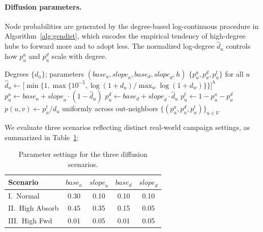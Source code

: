 \documentclass[sigconf]{acmart}
\begin{document}
\paragraph{Diffusion parameters.}
Node probabilities are generated by the degree-based log-continuous
procedure in Algorithm~\ref{alg:gendist}, which encodes the empirical
tendency of high-degree hubs to forward more and to adopt less.
The normalized log-degree $\hat{d}_u$ controls how $p_u^a$ and $p_u^d$
scale with degree.

\begin{algorithm}[t]
\caption{Degree-Based Node Probability Generation}
\label{alg:gendist}
\begin{algorithmic}[1]
\Require Degrees $\{d_u\}$; parameters
  $(\mathit{base}_a, \mathit{slope}_a, \mathit{base}_d,
    \mathit{slope}_d, h)$
\Ensure $\{p_u^a, p_u^d, p_u^t\}$ for all $u$
  \State $\hat{d}_u \gets
    \bigl[\min\{1,\max\{10^{-5},
    \log(1{+}d_u)/\max_w\log(1{+}d_w)\}\}\bigr]^h$
\EndFor
{}
  \State $p_u^a \gets \mathit{base}_a
    + \mathit{slope}_a \cdot (1-\hat{d}_u)$
  \State $p_u^d \gets \mathit{base}_d
    + \mathit{slope}_d \cdot \hat{d}_u$
  \State $p_u^t \gets 1 - p_u^a - p_u^d$
\EndFor
\State $p(u,v) \gets p_u^t / d_u$ uniformly across out-neighbors
\State \Return $\{(p_u^a, p_u^d, p_u^t)\}_{u\in V}$
\end{algorithmic}
\end{algorithm}

We evaluate three scenarios reflecting distinct real-world campaign
settings, as summarized in Table~\ref{tab:scenarios}:

\begin{table}[t]
  \caption{Parameter settings for the three diffusion scenarios.}
  \label{tab:scenarios}
  \centering
  \begin{tabular}{lcccc}
    \toprule
    Scenario & $\mathit{base}_a$ & $\mathit{slope}_a$ &
              $\mathit{base}_d$ & $\mathit{slope}_d$ \\
    \midrule
    I.\ Normal       & 0.30 & 0.10 & 0.10 & 0.10 \\
    II.\ High Absorb & 0.45 & 0.35 & 0.15 & 0.05 \\
    III.\ High Fwd   & 0.01 & 0.05 & 0.01 & 0.05 \\
    \bottomrule
  \end{tabular}
\end{table}
\end{document}
